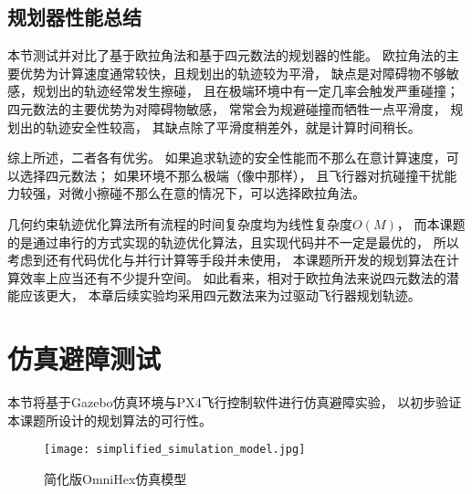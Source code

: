 
\subsection{规划器性能总结}
本节测试并对比了基于欧拉角法和基于四元数法的规划器的性能。
欧拉角法的主要优势为计算速度通常较快，且规划出的轨迹较为平滑，
缺点是对障碍物不够敏感，规划出的轨迹经常发生擦碰，
且在极端环境中有一定几率会触发严重碰撞；
四元数法的主要优势为对障碍物敏感，
常常会为规避碰撞而牺牲一点平滑度，
规划出的轨迹安全性较高，
其缺点除了平滑度稍差外，就是计算时间稍长。

综上所述，二者各有优劣。
如果追求轨迹的安全性能而不那么在意计算速度，可以选择四元数法；
如果环境不那么极端（像中那样），
且飞行器对抗碰撞干扰能力较强，对微小擦碰不那么在意的情况下，可以选择欧拉角法。

几何约束轨迹优化算法所有流程的时间复杂度均为线性复杂度$O(M)$，
而本课题的是通过串行的方式实现的轨迹优化算法，且实现代码并不一定是最优的，
所以考虑到还有代码优化与并行计算等手段并未使用，
本课题所开发的规划算法在计算效率上应当还有不少提升空间。
如此看来，相对于欧拉角法来说四元数法的潜能应该更大，
本章后续实验均采用四元数法来为过驱动飞行器规划轨迹。

\section{仿真避障测试}\label{sec:simulation_experiments}
本节将基于Gazebo仿真环境与PX4飞行控制软件进行仿真避障实验，
以初步验证本课题所设计的规划算法的可行性。
\begin{figure}[!ht]
    \centering
    \texttt{[image: simplified\_simulation\_model.jpg]}
    \caption{简化版OmniHex仿真模型}
    \label{fig:simplified_simulation_model}
\end{figure}

